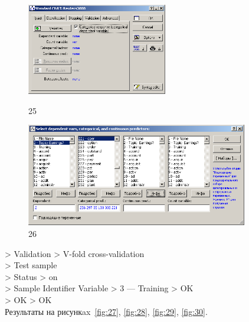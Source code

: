 \begin{figure}[!h]
  \centering

  \begin{minipage}{0.29\textwidth}
    \centering

    \includegraphics[height=4cm]
    {inc/25.PNG}

    \caption{25}

    \label{fig:25}
  \end{minipage}
  \begin{minipage}{0.69\textwidth}
    \centering

    \includegraphics[height=4.5cm]
    {inc/26.PNG}

    \caption{26}

    \label{fig:26}
  \end{minipage}
\end{figure}

> Validation > V-fold cross-validation \\
> Test sample \\
> Status > on \\
> Sample Identifier Variable > 3 — Training > OK \\
> OK > OK \\

Результаты на рисункax~\ref{fig:27}, \ref{fig:28}, \ref{fig:29}, \ref{fig:30}.

